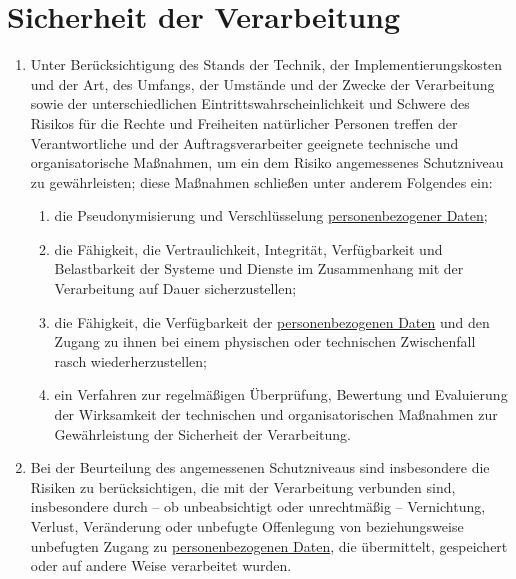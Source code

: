 \chapter{Sicherheit der Verarbeitung}
\label{ch:32}


\begin{enumerate}

  \item Unter Berücksichtigung des Stands der Technik, der Implementierungskosten und der Art, des Umfangs, der Umstände
   und der Zwecke der Verarbeitung sowie der unterschiedlichen Eintrittswahrscheinlichkeit und Schwere des Risikos für
   die Rechte und Freiheiten natürlicher Personen treffen der Verantwortliche und der Auftragsverarbeiter geeignete
   technische und organisatorische Maßnahmen, um ein dem Risiko angemessenes Schutzniveau zu gewährleisten; diese
   Maßnahmen schließen unter anderem Folgendes ein:
  \label{itm:32-1}

  \begin{enumerate}
  
    \item die Pseudonymisierung und Verschlüsselung \hyperref[itm:04-1]{personenbezogener Daten};
    \label{itm:32-1a}

    \item die Fähigkeit, die Vertraulichkeit, Integrität, Verfügbarkeit und Belastbarkeit der Systeme und Dienste im
     Zusammenhang mit der Verarbeitung auf Dauer sicherzustellen;
    \label{itm:32-1b}

    \item die Fähigkeit, die Verfügbarkeit der \hyperref[itm:04-1]{personenbezogenen Daten} und den Zugang zu ihnen bei einem physischen oder
     technischen Zwischenfall rasch wiederherzustellen;
    \label{itm:32-1c}

    \item ein Verfahren zur regelmäßigen Überprüfung, Bewertung und Evaluierung der Wirksamkeit der technischen und
     organisatorischen Maßnahmen zur Gewährleistung der Sicherheit der Verarbeitung.
    \label{itm:32-1d}

  \end{enumerate}

  \item Bei der Beurteilung des angemessenen Schutzniveaus sind insbesondere die Risiken zu berücksichtigen, die mit der
   Verarbeitung verbunden sind, insbesondere durch -- ob unbeabsichtigt oder unrechtmäßig -- Vernichtung, Verlust,
   Veränderung oder unbefugte Offenlegung von beziehungsweise unbefugten Zugang zu \hyperref[itm:04-1]{personenbezogenen Daten}, die
   übermittelt, gespeichert oder auf andere Weise verarbeitet wurden.
  \label{itm:32-2}


\end{enumerate}
